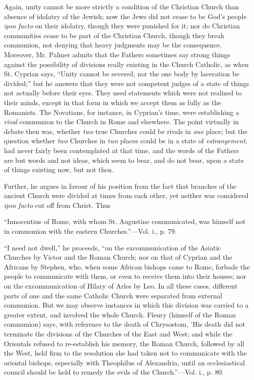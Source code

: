 Again, unity cannot be more strictly a condition
of the Christian Church than absence of idolatry of the Jewish; now
the Jews did not cease to be God's people \emph{ipso facto} on their
idolatry, though they were punished for it; nor do Christian
communities cease to be part of the Christian Church, though they
break communion, not denying that heavy judgments may be the
consequence. Moreover, Mr. Palmer admits that the Fathers sometimes
say strong things against the possibility of divisions really existing
in the Church Catholic, as when St. Cyprian says, ``Unity cannot be
severed, nor the one body by laceration be divided;'' but he answers
that they were not competent judges of a state of things not actually
before their eyes. They used statements which were not realized to
their minds, except in that form in which we accept them as fully as
the Romanists. The Novatians, for instance, in Cyprian's time, were
establishing a \emph{rival} communion to the Church in Rome and
elsewhere. The point virtually in debate then was, whether \emph{two}
true Churches could be rivals in \emph{one} place; but the question
whether \emph{two} Churches in \emph{two} places could be in a state
of \emph{estrangement}, had never fairly been contemplated at
that time, and the words of the Fathers are but words and not ideas,
which seem to bear, and do not bear, upon a state of things existing
now, but not then.

Further, he argues in favour of his position from
the fact that branches of the ancient Church were divided at times
from each other, yet neither was considered \emph{ipso facto} cut off
from Christ. Thus

``Innocentius
of Rome, with whom St. Augustine communicated, was himself not in
communion with the eastern Churches.''—Vol. i., p. 79.

``I
need not dwell,'' he proceeds, ``on the excommunication of the Asiatic
Churches by Victor and the Roman Church; nor on that of Cyprian and
the Africans by Stephen, who, when some African bishops came to Rome,
forbade the people to communicate with them, or even to receive them
into their houses; nor on the excommunication of Hilary of Arles by
Leo. In all these cases, different parts of one and the same Catholic
Church were separated from external communion. But we may observe
instances in which this division was carried to a greater extent, and
involved the whole Church. Fleury (himself of the Roman communion)
says, with reference to the death of Chrysostom, 'His death did not
terminate the divisions of the Churches of the East and West; and
while the Orientals refused to re-establish his memory, the Roman
Church, followed by all the West, held firm to the resolution she had
taken not to communicate with the oriental bishops, especially with
Theophilus of Alexandria, until an ecclesiastical council should be
held to remedy the evils of the Church.''—Vol. i., p. 80.

